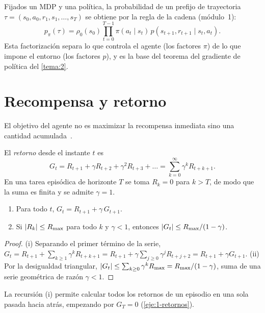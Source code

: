 Fijados un MDP y una política, la probabilidad de un prefijo de trayectoria $\tau=(s_0,a_0,r_1,s_1,\dots,s_T)$ se obtiene por la regla de la cadena (módulo~1):
\begin{equation}\label{eq:ptau}
p_\pi(\tau)=\rho_0(s_0)\prod_{t=0}^{T-1}\pi(a_t\mid s_t)\,p(s_{t+1},r_{t+1}\mid s_t,a_t).
\end{equation}
Esta factorización separa lo que controla el agente (los factores $\pi$) de lo que impone el entorno (los factores $p$), y es la base del teorema del gradiente de política del \cref{tema:2}.

\section{Recompensa y retorno}

El objetivo del agente no es maximizar la recompensa inmediata sino una cantidad acumulada~\cite[cap.~3]{sb}.

\begin{definicion}[Retorno]\label{def:retorno}
El \emph{retorno} desde el instante $t$ es
\[
G_t=R_{t+1}+\gamma R_{t+2}+\gamma^{2}R_{t+3}+\dots=\sum_{k=0}^{\infty}\gamma^{k}R_{t+k+1}.
\]
En una tarea episódica de horizonte $T$ se toma $R_k=0$ para $k>T$, de modo que la suma es finita y se admite $\gamma=1$.
\end{definicion}

\begin{proposicion}\label{prop:retorno}
\begin{enumerate}
  \item Para todo $t$, $G_t=R_{t+1}+\gamma\,G_{t+1}$.
  \item Si $\lvert R_k\rvert\le R_{\max}$ para todo $k$ y $\gamma<1$, entonces $\lvert G_t\rvert\le R_{\max}/(1-\gamma)$.
\end{enumerate}
\end{proposicion}

\begin{proof}
(i) Separando el primer término de la serie, $G_t=R_{t+1}+\sum_{k\ge 1}\gamma^{k}R_{t+k+1}=R_{t+1}+\gamma\sum_{j\ge 0}\gamma^{j}R_{t+j+2}=R_{t+1}+\gamma G_{t+1}$.
(ii) Por la desigualdad triangular, $\lvert G_t\rvert\le\sum_{k\ge0}\gamma^{k}R_{\max}=R_{\max}/(1-\gamma)$, suma de una serie geométrica de razón $\gamma<1$.
\end{proof}

La recursión (i) permite calcular todos los retornos de un episodio en una sola pasada hacia atrás, empezando por $G_T=0$ (\cref{eje:1-retornos}).

